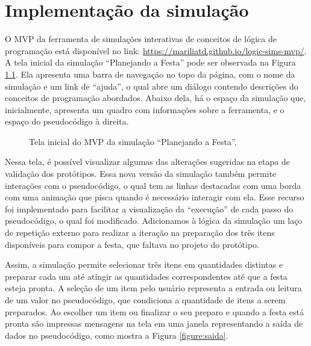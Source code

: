 
\chapter{Implementação da simulação} 
\label{cap_mvp}

O MVP da ferramenta de simulações interativas de conceitos de lógica de programação está disponível no link: \url{https://mariliatd.github.io/logic-sims-mvp/}. A tela inicial da simulação \enquote{Planejando a Festa} pode ser observada na Figura \ref{figure:tela_inicial}. Ela apresenta uma barra de navegação no topo da página, com o nome da simulação e um link de \enquote{ajuda}, o qual abre um diálogo contendo descrições do conceitos de programação abordados. Abaixo dela, há o espaço da simulação que, inicialmente, apresenta um quadro com informações sobre a ferramenta, e o espaço do pseudocódigo à direita.

\begin{figure}[h!]
    \centering
    \setlength{\fboxrule}{0.1pt} %
    \caption{Tela inicial do MVP da simulação \enquote{Planejando a Festa}.}
    \label{figure:tela_inicial}
\end{figure}

Nessa tela, é possível visualizar algumas das alterações sugeridas na etapa de validação dos protótipos. Essa nova versão da simulação também permite interações com o pseudocódigo, o qual tem as linhas destacadas com uma borda com uma animação que pisca quando é necessário interagir com ela. Esse recurso foi implementado para facilitar a visualização da \enquote{execução} de cada passo do pseudocódigo, o qual foi modificado. Adicionamos à lógica da simulação um laço de repetição externo para realizar a iteração na preparação dos três itens disponíveis para compor a festa, que faltava no projeto do protótipo.

Assim, a simulação permite selecionar três itens em quantidades distintas e preparar cada um até atingir as quantidades correspondentes até que a festa esteja pronta. A seleção de um item pelo usuário representa a entrada ou leitura de um valor no pseudocódigo, que condiciona a quantidade de itens a serem preparados. Ao escolher um item ou finalizar o seu preparo e quando a festa está pronta são impressas mensagens na tela em uma janela representando a saída de dados no pseudocódigo, como mostra a Figura \ref{figure:saida}. 

